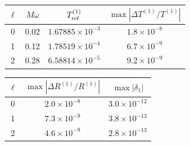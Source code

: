 \documentclass[UTF8,fontset=fandol,12pt,a4paper,oneside,openany]{ctexrep}
\begin{document}
\noindent\begin{minipage}{\linewidth}
\captionsetup{type=table}\caption{轴对称低频的配对分辨率检验。}\label{audit:tab:low-convergence}
\centering\fontsize{10.5}{14}\selectfont
\setlength{\tabcolsep}{6pt}\renewcommand{\arraystretch}{1.2}
\par{}\par\smallskip
\begin{tabular}{cccc}\toprule
$\ell$ & $M\omega$ & $T^{(1)}_{\rm ref}$ & $\max|\Delta T^{(1)}/T^{(1)}|$\\\midrule
0 & 0.02 & $1.67885\times10^{-3}$ & $1.8\times10^{-8}$\\
1 & 0.12 & $1.78519\times10^{-4}$ & $6.7\times10^{-9}$\\
2 & 0.28 & $6.58814\times10^{-5}$ & $9.2\times10^{-9}$\\
\bottomrule\end{tabular}
\par\medskip
\par{}\par\smallskip
\begin{tabular}{ccc}\toprule
$\ell$ & $\max|\Delta R^{(1)}/R^{(1)}|$ & $\max|\delta_1|$\\\midrule
0 & $2.0\times10^{-8}$ & $3.0\times10^{-12}$\\
1 & $7.3\times10^{-9}$ & $3.8\times10^{-13}$\\
2 & $4.6\times10^{-9}$ & $2.8\times10^{-13}$\\
\bottomrule\end{tabular}
\end{minipage}\par\addvspace{10pt}
\par\addvspace{14pt}
\end{document}
